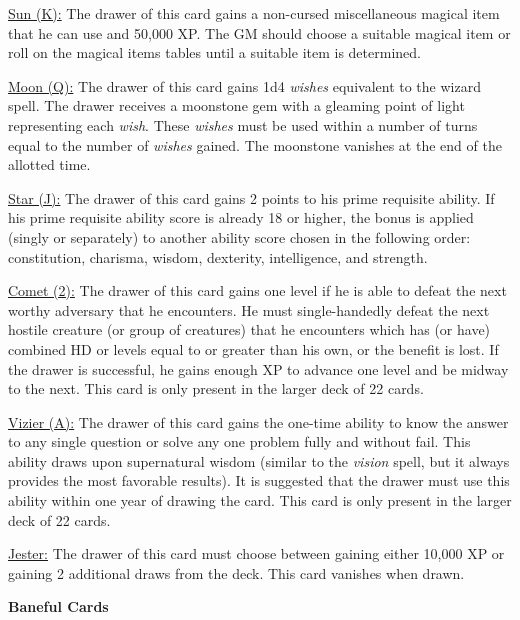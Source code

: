 \begin{multicols}{2}
\underline{Sun (K):} The drawer of this card gains a non-cursed miscellaneous magical item that he can use and 50,000 XP.  The GM should choose a suitable magical item or roll on the magical items tables until a suitable item is determined.

\underline{Moon (Q):} The drawer of this card gains 1d4 \textit{wishes} equivalent to the wizard spell.  The drawer receives a moonstone gem with a gleaming point of light representing each \textit{wish}.  These \textit{wishes} must be used within a number of turns equal to the number of \textit{wishes} gained.  The moonstone vanishes at the end of the allotted time.

\underline{Star (J):} The drawer of this card gains 2 points to his prime requisite ability.  If his prime requisite ability score is already 18 or higher, the bonus is applied (singly or separately) to another ability score chosen in the following order: constitution, charisma, wisdom, dexterity, intelligence, and strength.  

\underline{Comet (2):} The drawer of this card gains one level if he is able to defeat the next worthy adversary that he encounters.  He must single-handedly defeat the next hostile creature (or group of creatures) that he encounters which has (or have) combined HD or levels equal to or greater than his own, or the benefit is lost.  If the drawer is successful, he gains enough XP to advance one level and be midway to the next.  This card is only present in the larger deck of 22 cards.

\underline{Vizier (A):} The drawer of this card gains the one-time ability to know the answer to any single question or solve any one problem fully and without fail.  This ability draws upon supernatural wisdom (similar to the \textit{vision} spell, but it always provides the most favorable results).  It is suggested that the drawer must use this ability within one year of drawing the card.  This card is only present in the larger deck of 22 cards.

\underline{Jester:} The drawer of this card must choose between gaining either 10,000 XP or gaining 2 additional draws from the deck.  This card vanishes when drawn.

\vspace{1em}

\noindent \textbf{Baneful Cards}

\vspace{1em}


\end{multicols}
